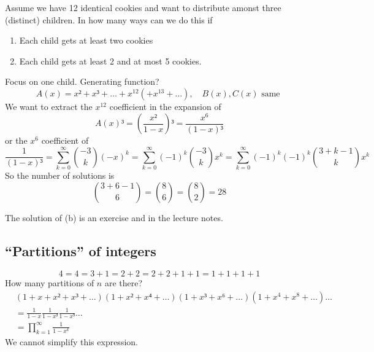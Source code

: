 \documentclass[english]{lbscript}
\begin{document}
\begin{example}{}{}
  Assume we have 12 identical cookies and want to distribute amonst three (distinct) children. In how many ways can we do this if
  \begin{enumerate}[label=(\alph{*})]
    \item\label{item:14} Each child gets at least two cookies
    \item\label{item:15} Each child gets at least 2 and at most 5 cookies.
  \end{enumerate}

  Focus on one child. Generating function?
  \begin{equation}
    \label{eq:37}
    A(x)=x²+x³+\dots+x^{12}(+x^{13}+\dots), \quad B(x), C(x) \text{ same }
  \end{equation}
  We want to extract the \(x^{12}\) coefficient in the expansion of
  \begin{equation}
    \label{eq:38}
    A(x)³ = \left( \frac{x²}{1-x} \right)³ = \frac{x^{6}}{(1-x)³}
  \end{equation}
  or the \(x^{6}\) coefficient of
  \begin{equation}
    \label{eq:39}
    \frac{1}{(1-x)³} = ∑_{k=0}^{∞} \binom{-3}{k} (-x)^{k} = ∑_{k=0}^{∞} (-1)^{k} \binom{-3}{k} x^{k} = ∑_{k=0}^{∞} (-1)^{k}(-1)^{k} \binom{3+k-1}{k} x^{k}
  \end{equation}
  So the number of solutions is
  \begin{equation}
    \label{eq:40}
    \binom{3+6-1}{6}= \binom{8}{6}=\binom{8}{2}= 28
  \end{equation}

  The solution of (b) is an exercise and in the lecture notes.

\end{example}

\subsection{\enquote{Partitions} of integers}
\begin{equation}
  \label{eq:42}
  4 = 4 = 3+1=2+2=2+2+1+1=1+1+1+1
\end{equation}
How many partitions of \(n\) are there?
\begin{align}
  \label{eq:43}
   & \left(1+x+x²+x³+\dots \right) \left(1+x²+x⁴+\dots \right) \left(1+x³+x⁶+\dots \right) \left(1+x^{4}+x^{8}+\dots \right) \dots \\
   & = \frac{1}{1-x} \frac{1}{1-x²} \frac{1}{1-x³}\dots                                                                            \\
   & = \prod_{k=1}^{∞} \frac{1}{1-x^{k}}
\end{align}
We cannot simplify this expression.
\end{document}
